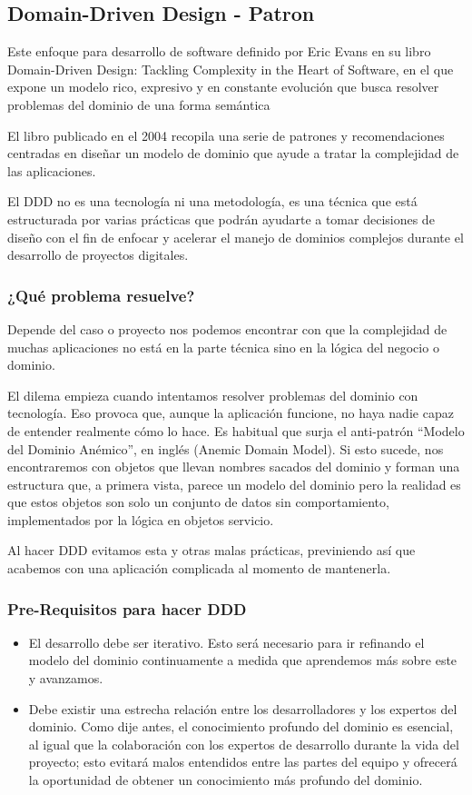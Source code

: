 \documentclass[12pt,letterpaper]{article}
\begin{document}
\subsection{Domain-Driven Design - Patron}

Este enfoque para desarrollo de software definido por Eric Evans en su libro Domain-Driven Design: Tackling Complexity in the Heart of Software, en el que expone un modelo rico, expresivo y en constante evolución que busca resolver problemas del dominio de una forma semántica

El libro publicado en el 2004 recopila una serie de patrones y recomendaciones centradas en diseñar un modelo de dominio que ayude a tratar la complejidad de las aplicaciones. 

El DDD no es una tecnología ni una metodología, es una técnica que está estructurada por varias prácticas que podrán ayudarte a tomar decisiones de diseño con el fin de enfocar y acelerar el manejo de dominios complejos durante el desarrollo de proyectos digitales.

\subsubsection{¿Qué problema resuelve?}

Depende del caso o proyecto nos podemos encontrar con que la complejidad de muchas aplicaciones no está en la parte técnica sino en la lógica del negocio o dominio.

El dilema empieza cuando intentamos resolver problemas del dominio con tecnología. Eso provoca que, aunque la aplicación funcione, no haya nadie capaz de entender realmente cómo lo hace.
Es habitual que surja el anti-patrón “Modelo del Dominio Anémico”, en inglés (Anemic Domain Model). Si esto sucede, nos encontraremos con objetos que llevan nombres sacados del dominio y forman una estructura que, a primera vista, parece un modelo del dominio pero la realidad es que estos objetos son solo un conjunto de datos sin comportamiento, implementados por la lógica en objetos servicio.

Al hacer DDD evitamos esta y otras malas prácticas, previniendo así que acabemos con una aplicación complicada al momento de mantenerla.

\subsubsection{Pre-Requisitos para hacer DDD}

\begin{itemize}
    \item El desarrollo debe ser iterativo. Esto será necesario para ir refinando el modelo del dominio continuamente a medida que aprendemos más sobre este y avanzamos.
    \item Debe existir una estrecha relación entre los desarrolladores y los expertos del dominio. Como dije antes, el conocimiento profundo del dominio es esencial, al igual que la colaboración con los expertos de desarrollo durante la vida del proyecto; esto evitará malos entendidos entre las partes del equipo y ofrecerá la oportunidad de obtener un conocimiento más profundo del dominio.
\end{itemize}
\end{document}
